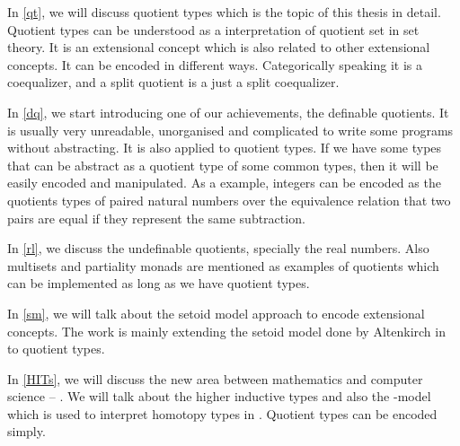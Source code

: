 In \autoref{qt}, we will discuss quotient types which is the topic of
this thesis in detail. Quotient types
can be understood as a interpretation of quotient set in set
theory. It is an extensional concept which is also related to other extensional concepts. It can be encoded in different ways. Categorically speaking it
is a coequalizer, and a split quotient is a just a split coequalizer.


In \autoref{dq}, we start introducing one of our achievements, the
definable quotients. It is usually very unreadable, unorganised and
complicated to write some programs without abstracting. It is also
applied to quotient types. If we have some types that can be abstract
as a quotient type of some common types, then it will be easily
encoded and manipulated. As a example, integers can be encoded as the
quotients types of paired natural numbers over the equivalence
relation that two pairs are equal if they represent the same
subtraction.

In \autoref{rl}, we discuss the undefinable quotients, specially the
real numbers. Also multisets and partiality monads are mentioned as
examples of quotients which can be implemented as long as we have
quotient types. 


In \autoref{sm}, we will talk about the setoid model approach to encode
extensional concepts. The work is mainly extending the setoid model
done by Altenkirch in \cite{alti:lics99} to
quotient types.


In \autoref{HITs}, we will discuss the new area between mathematics and
computer science -- \hott. We will talk about the higher inductive
types and also the \wog-model which is used to interpret
homotopy types in \itt. Quotient types can be encoded \hott simply.